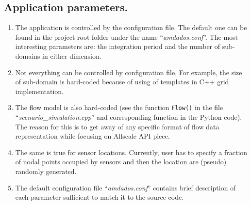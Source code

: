 \documentclass[]{article}
\begin{document}
\subsection{Application parameters.}
\begin{enumerate}
\item The application is controlled by the configuration file. The default one can be found in the project root folder under the name ``\textit{amdados.conf}''. The most interesting parameters are: the integration period and the number of sub-domains in either dimension. 
\item Not everything can be controlled by configuration file. For example, the size of sub-domain is hard-coded because of using of templates in C++ grid implementation.
\item The flow model is also hard-coded (see the function \texttt{Flow()} in the file ``\textit{scenario\_simulation.cpp}'' and corresponding function in the Python code). The reason for this is to get away of any specific format of flow data representation while focusing on Allscale API piece.
\item The same is true for sensor locations. Currently, user has to specify a fraction of nodal points occupied by sensors and then the location are (pseudo) randomly generated.
\item The default configuration file ``\textit{amdados.conf}'' contains brief description of each parameter sufficient to match it to the source code.
\end{enumerate}

\end{document}
